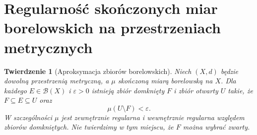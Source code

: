 \documentclass[11pt,a4paper,oneside]{book}
\numberwithin{equation}{chapter}
\theoremstyle{plain}
\newtheorem{twierdzenie}{Twierdzenie}[chapter]
\theoremstyle{definition}
\theoremstyle{remark}
\begin{document}
\section{Regularność skończonych miar borelowskich na przestrzeniach metrycznych}
\begin{twierdzenie}[Aproksymacja zbiorów borelowskich]
\label{thm:finite-metric-regular-20}
Niech $(X,d)$ będzie dowolną przestrzenią metryczną,
a $\mu$ skończoną miarą borelowską na $X$.
Dla każdego $E\in\mathcal B(X)$ i $\varepsilon>0$
istnieją zbiór domknięty $F$ i zbiór otwarty $U$ takie,
że $F\subseteq E\subseteq U$ oraz
\begin{equation}\label{eq:finite-regular-error-20}
 \mu(U\setminus F)<\varepsilon.
\end{equation}
W szczególności $\mu$ jest zewnętrznie regularna
i wewnętrznie regularna względem zbiorów domkniętych.
Nie twierdzimy w tym miejscu, że $F$ można wybrać zwarty.
\end{twierdzenie}
\end{document}
